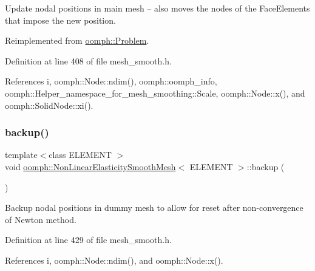 Update nodal positions in main mesh -- also moves the nodes of the Face\+Elements that impose the new position. 



Reimplemented from \hyperlink{classoomph_1_1Problem_a0c8d70891f7369bb4bf8412fa1a08ecb}{oomph\+::\+Problem}.



Definition at line 408 of file mesh\+\_\+smooth.\+h.



References i, oomph\+::\+Node\+::ndim(), oomph\+::oomph\+\_\+info, oomph\+::\+Helper\+\_\+namespace\+\_\+for\+\_\+mesh\+\_\+smoothing\+::\+Scale, oomph\+::\+Node\+::x(), and oomph\+::\+Solid\+Node\+::xi().

\mbox{\label{classoomph_1_1NonLinearElasticitySmoothMesh_a07ef87c5d5c74b5d9ceb23800608c87a}} 
\subsubsection{\texorpdfstring{backup()}{backup()}}
{\footnotesize\ttfamily template$<$class E\+L\+E\+M\+E\+NT $>$ \\
void \hyperlink{classoomph_1_1NonLinearElasticitySmoothMesh}{oomph\+::\+Non\+Linear\+Elasticity\+Smooth\+Mesh}$<$ E\+L\+E\+M\+E\+NT $>$\+::backup (\begin{DoxyParamCaption}{ }\end{DoxyParamCaption})\hspace{0.3cm}{\ttfamily [inline]}}



Backup nodal positions in dummy mesh to allow for reset after non-\/convergence of Newton method. 



Definition at line 429 of file mesh\+\_\+smooth.\+h.



References i, oomph\+::\+Node\+::ndim(), and oomph\+::\+Node\+::x().

\mbox{\label{classoomph_1_1NonLinearElasticitySmoothMesh_a47de05f2c3a8c3fb712dbdb7a1349db6}} 
